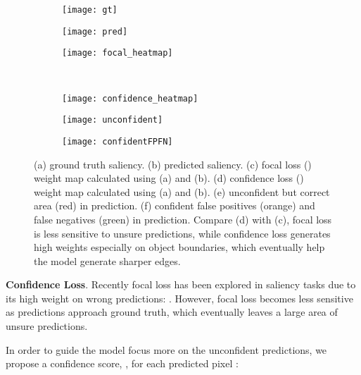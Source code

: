 \documentclass[10pt,twocolumn,letterpaper]{article}
\begin{document}
\begin{figure}[!h]
\centering
\begin{subfigure}{.32\linewidth}
\centering
\texttt{[image: gt]}
\caption{}
\label{fig:gt}
\end{subfigure}
\begin{subfigure}{.32\linewidth}
\centering
\texttt{[image: pred]}
\caption{}
\label{fig:pred}
\end{subfigure}
\begin{subfigure}{.32\linewidth}
\centering
\texttt{[image: focal\_heatmap]}
\caption{}
\label{fig:focal_heatmap}
\end{subfigure}
\\
\begin{subfigure}{.32\linewidth}
\centering
\texttt{[image: confidence\_heatmap]}
\caption{}
\label{fig:confidence_heatmap}
\end{subfigure}
\begin{subfigure}{.32\linewidth}
\centering
\texttt{[image: unconfident]}
\caption{}
\label{fig:unconfident}
\end{subfigure}
\begin{subfigure}{.32\linewidth}
\centering
\texttt{[image: confidentFPFN]}
\caption{}
\label{fig:confidentFPFN}
\end{subfigure}
\vspace{-0.01\linewidth}
\caption{(a) ground truth saliency. (b) predicted saliency. (c) focal loss () weight map calculated using (a) and (b). (d) confidence loss () weight map calculated using (a) and (b). (e) unconfident but correct area (red) in prediction. (f) confident false positives (orange) and false negatives (green) in prediction. Compare (d) with (c), focal loss is less sensitive to unsure predictions,  while confidence loss generates high weights especially on object boundaries, which eventually help the model generate sharper edges.}
\label{fig:loss}
\end{figure}

\textbf{Confidence Loss}.
Recently focal loss \cite{FOCAL}\cite{focalSOD} has been explored in saliency tasks due to its high weight on wrong predictions: . However, focal loss becomes less sensitive as predictions approach ground truth, which eventually leaves a large area of unsure predictions.

In order to guide the model focus more on the unconfident predictions, we propose a confidence score, , for each predicted pixel :
\end{document}
